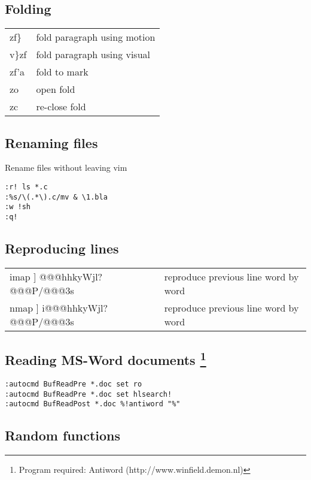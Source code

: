 \subsection{Folding}
\begin{center}
\begin{longtable}{l|l}
 zf\} & fold paragraph using motion\\
 v\}zf & fold paragraph using visual\\
 zf'a & fold to mark\\
 zo & open fold\\
 zc & re-close fold
\end{longtable}
\end{center}

\subsection{Renaming files}
Rename files without leaving vim
\begin{verbatim}
:r! ls *.c
:%s/\(.*\).c/mv & \1.bla
:w !sh
:q!
\end{verbatim}

\subsection{Reproducing lines}
\begin{center}
\begin{longtable}{l|l}
 imap ] @@@hhkyWjl?@@@P/@@@3s & reproduce previous line word by word\\
 nmap ] i@@@hhkyWjl?@@@P/@@@3s & reproduce previous line word by word
\end{longtable}
\end{center}

\subsection[Reading MS-Word documents]
{Reading MS-Word documents \footnote{Program required: Antiword (http://www.winfield.demon.nl)}}

\begin{verbatim}
:autocmd BufReadPre *.doc set ro
:autocmd BufReadPre *.doc set hlsearch!
:autocmd BufReadPost *.doc %!antiword "%"
\end{verbatim}

\subsection{Random functions}

